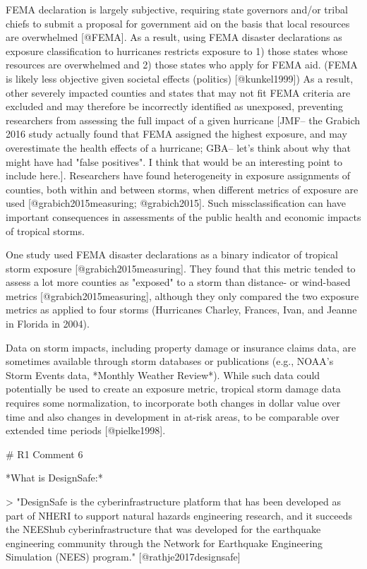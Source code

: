 FEMA declaration is largely subjective, requiring state governors and/or tribal
chiefs to submit a proposal for government aid on the basis that local resources
are overwhelmed [@FEMA]. As a result, using FEMA disaster declarations as
exposure classification to hurricanes restricts exposure to 1) those states
whose resources are overwhelmed and 2) those states who apply for FEMA aid.
(FEMA is likely less objective given societal effects (politics) [@kunkel1999])
As a result, other severely impacted counties and states that may not fit FEMA
criteria are excluded and may therefore be incorrectly identified as unexposed,
preventing researchers from assessing the full impact of a given hurricane
[JMF-- the Grabich 2016 study actually found that FEMA assigned the highest
exposure, and may overestimate the health effects of a hurricane; GBA-- let's
think about why that might have had "false positives". I think that would be an
interesting point to include here.]. Researchers have found heterogeneity in
exposure assignments of counties, both within and between storms, when different
metrics of exposure are used [@grabich2015measuring; @grabich2015]. Such
missclassification can have important consequences in assessments of the public
health and economic impacts of tropical storms.

One study used FEMA disaster declarations as a binary indicator of tropical
storm exposure [@grabich2015measuring]. They found that this metric tended to assess a
lot more counties as "exposed" to a storm than distance- or wind-based metrics
[@grabich2015measuring], although they only compared the two exposure metrics as applied
to four storms (Hurricanes Charley, Frances, Ivan, and Jeanne in Florida in
2004).

Data on storm impacts, including property damage or insurance claims data, are
sometimes available through storm databases or publications (e.g., NOAA's Storm
Events data, *Monthly Weather Review*). While such data could potentially be
used to create an exposure metric, tropical storm damage data requires some
normalization, to incorporate both changes in dollar value over time and also
changes in development in at-risk areas, to be comparable over extended time
periods [@pielke1998].


# R1 Comment 6

*What is DesignSafe:*

> "DesignSafe is the cyberinfrastructure platform that has been developed as
part of NHERI to support natural hazards engineering research, and
it succeeds the NEEShub cyberinfrastructure that was developed for the
earthquake engineering community through the Network for Earthquake
Engineering Simulation (NEES) program." [@rathje2017designsafe]

